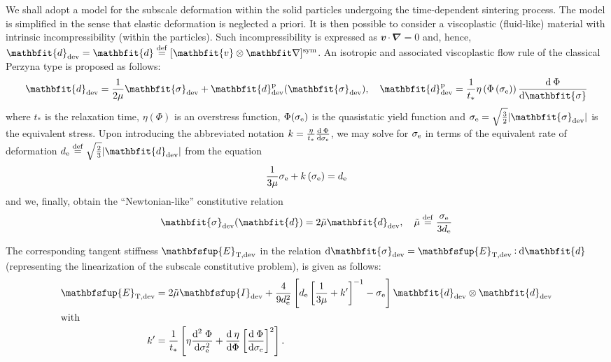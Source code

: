 \documentclass[12pt,a4paper,fleqn]{article}
\renewcommand{\ta}[1]{\mathbfit{#1}}
\renewcommand{\ts}[1]{\mathbfit{#1}}
\renewcommand{\tf}[1]{\mathbfsfup{#1}}
\newcommand{\tang}{\mathrm{T}}
\begin{document}
We shall adopt a model for the subscale deformation within the solid particles undergoing the time-dependent sintering process.
The model is simplified in the sense that elastic deformation is neglected a priori.
It is then possible to consider a viscoplastic (fluid-like) material with intrinsic incompressibility (within the particles).
Such incompressibility is expressed as $\ta{v}\cdot\ts{\nabla}=0$ and, hence, $\ts{d}_\dev=\ts{d}\defeq[\ta v\outerp\diff]^\sym$.
An isotropic and associated viscoplastic flow rule of the classical Perzyna type is proposed as follows:
\begin{equation}
    \ts{d}_\dev = \frac{1}{2\mu}\ts{\sigma}_\dev + \ts{d}_\dev^\pl(\ts{\sigma}_\dev), \quad
    \ts{d}_\dev^\pl = \frac{1}{t_*}\eta\left(\Phi\left(\sigma_\eqv\right)\right)\od{\Phi}{\ts\sigma}
\label{eq:d_sigma}
\end{equation}
where $t_*$ is the relaxation time, $\eta(\Phi)$ is an overstress function, $\Phi(\sigma_{\mathrm{e}})$ is the quasistatic yield function and $\sigma_\eqv=\sqrt{\frac{3}{2}}|\ts{\sigma}_\dev|$ is the equivalent stress.
Upon introducing the abbreviated notation $k=\frac{\eta}{t_*}\frac{\operatorname{d \!}\:\Phi}{\operatorname{d \!} \sigma_{\mathrm{e}}}$, we may solve for $\sigma_{\mathrm{e}}$ in terms of the equivalent rate of deformation $d_\eqv\defeq\sqrt{\frac{2}{3}}|\ts{d}_\dev|$ from the equation
\begin{equation}
    \frac{1}{3\mu}\sigma_{\mathrm{e}} + k\left(\sigma_{\mathrm{e}}\right) = d_{\mathrm{e}}
\label{eq:de_sigmae}
\end{equation}
and we, finally, obtain the ``Newtonian-like'' constitutive relation
\begin{equation}
    \ts{\sigma}_\dev(\ts{d}) = 2\tilde{\mu}\ts{d}_\dev, \quad
    \tilde{\mu}\defeq \frac{\sigma_\eqv}{3d_\eqv}
\label{eq:sigma_d}
\end{equation}

The corresponding tangent stiffness $\tf{E}_{\tang,\dev}$ in the relation $\dif\ts{\sigma}_\dev=\tf{E}_{\tang,\dev}\dprod\dif\ts{d}$ (representing the linearization of the subscale constitutive problem), is given as follows:
\begin{align}
 \tf E_{\tang,\dev} &= 2\tilde{\mu} \tf I_\dev + \frac{4}{9 d_\eqv^2} \left[ d_\eqv \left[ \frac{1}{3\mu} + k' \right]^{-1} - \sigma_\eqv \right] \ts d_\dev \outerp\ts d_\dev\\
\intertext{with}
 k' &= \frac{1}{t_*}\left[\eta \frac{\mathrm{d}^2\;\Phi}{\dif\sigma_\eqv^2} + \od{\eta}{\Phi}\left[\od{\Phi}{\sigma_\eqv}\right]^2\right].
\end{align}
\end{document}
